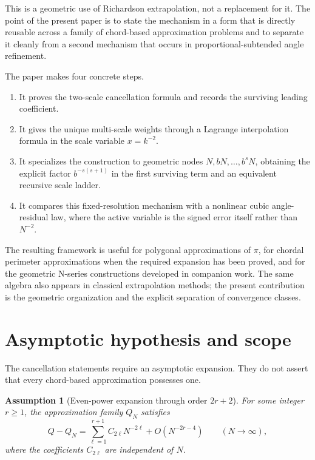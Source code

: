\documentclass[11pt]{article}
\newtheorem{assumption}[theorem]{Assumption}
\theoremstyle{remark}
\begin{document}
This is a geometric use of Richardson extrapolation, not a replacement for
it.  The point of the present paper is to state the mechanism in a form that
is directly reusable across a family of chord-based approximation problems
and to separate it cleanly from a second mechanism that occurs in
proportional-subtended angle refinement.

The paper makes four concrete steps.
\begin{enumerate}
\item It proves the two-scale cancellation formula and records the surviving
leading coefficient.
\item It gives the unique multi-scale weights through a Lagrange interpolation
formula in the scale variable $x=k^{-2}$.
\item It specializes the construction to geometric nodes
$N,bN,\ldots,b^sN$, obtaining the explicit factor $b^{-s(s+1)}$ in the
first surviving term and an equivalent recursive scale ladder.
\item It compares this fixed-resolution mechanism with a nonlinear cubic
angle-residual law, where the active variable is the signed error itself
rather than $N^{-2}$.
\end{enumerate}

The resulting framework is useful for polygonal approximations of $\pi$,
for chordal perimeter approximations when the required expansion has been
proved, and for the geometric N-series constructions developed in companion
work.  The same algebra also appears in classical extrapolation methods; the
present contribution is the geometric organization and the explicit
separation of convergence classes.

\section{Asymptotic hypothesis and scope}

The cancellation statements require an asymptotic expansion.  They do not
assert that every chord-based approximation possesses one.

\begin{assumption}[Even-power expansion through order $2r+2$]
\label{ass:even}
For some integer $r\ge 1$, the approximation family $Q_N$ satisfies
\begin{equation}
\label{eq:general-expansion}
Q-Q_N
=
\sum_{\ell=1}^{r+1} C_{2\ell}N^{-2\ell}
+O(N^{-2r-4})
\qquad (N\to\infty),
\end{equation}
where the coefficients $C_{2\ell}$ are independent of $N$.
\end{assumption}
\end{document}
